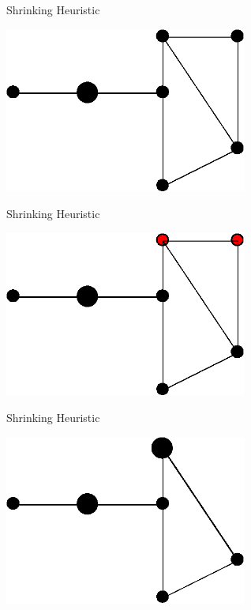 \documentclass[10pt]{beamer}
\begin{document}
\begin{frame}{Shrinking Heuristic}
\begin{example}
    \begin{center}
            \includegraphics[width=8cm]{Shrinking03.eps} 
    \end{center}
\end{example}
\end{frame}

\begin{frame}{Shrinking Heuristic}
\begin{example}
    \begin{center}
            \includegraphics[width=8cm]{Shrinking04.eps} 
    \end{center}
\end{example}
\end{frame}

\begin{frame}{Shrinking Heuristic}
\begin{example}
    \begin{center}
            \includegraphics[width=8cm]{Shrinking05.eps} 
    \end{center}
\end{example}
\end{frame}
\end{document}
